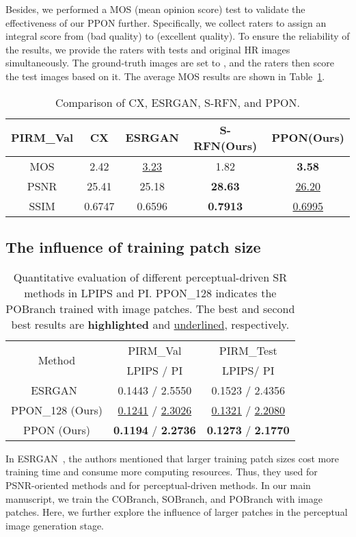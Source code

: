 \documentclass[preprint]{elsarticle}
\begin{document}
Besides, we performed a MOS (mean opinion score) test to validate the effectiveness of our PPON further. Specifically, we collect  raters to assign an integral score from  (bad quality) to  (excellent quality). To ensure the reliability of the results, we provide the raters with tests and original HR images simultaneously. The ground-truth images are set to , and the raters then score the test images based on it. The average MOS results are shown in Table~\ref{tab:MOS}. 
\begin{table}[htpb]
	\centering
	\caption{Comparison of CX, ESRGAN, S-RFN, and PPON.}
	\label{tab:MOS}
	\begin{tabular}{|c|c|c|c|c|}
		\hline
		PIRM\_Val & CX & ESRGAN & S-RFN(Ours) & PPON(Ours) \\
		\hline
		MOS & 2.42 & \underline{3.23} & 1.82 & \textbf{3.58} \\
		PSNR & 25.41 & 25.18 & \textbf{28.63} & \underline{26.20} \\
		SSIM & 0.6747 & 0.6596 & \textbf{0.7913} & \underline{0.6995} \\
		\hline
	\end{tabular}
\end{table}

\subsection{The influence of training patch size}
\begin{table}[htpb]
	\caption{Quantitative evaluation of different perceptual-driven SR methods in LPIPS and PI. PPON\_128 indicates the POBranch trained with  image patches. The best and second best results are \textbf{highlighted} and \underline{underlined}, respectively.}
	\label{tab:ppon-128-192}
	\begin{center}
		\begin{tabular}{|c|c|c|}
			\hline
			\multirow{2}{*}{Method} & PIRM\_Val & PIRM\_Test \\
			\cline{2-3}
			& LPIPS / PI & LPIPS/ PI \\
			\hline
			\hline
			ESRGAN~\cite{ESRGAN} & 0.1443 / 2.5550 & 0.1523 / 2.4356 \\
			PPON\_128 (Ours) & \underline{ 0.1241} / \underline{2.3026} & \underline{0.1321} / \underline{2.2080} \\
			PPON (Ours) & \textbf{0.1194} / \textbf{2.2736} & \textbf{0.1273} / \textbf{2.1770} \\
			\hline
		\end{tabular}
	\end{center}
\end{table}
In ESRGAN~\cite{ESRGAN}, the authors mentioned that larger training patch sizes cost more training time and consume more computing resources. Thus, they used  for PSNR-oriented methods and  for perceptual-driven methods. In our main manuscript, we train the COBranch, SOBranch, and POBranch with  image patches. Here, we further explore the influence of larger patches in the perceptual image generation stage.
\end{document}
